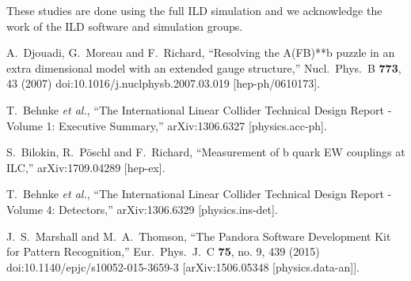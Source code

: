 \documentclass{PoS}
\begin{document}
These studies are done using the full ILD simulation and we acknowledge the work of the ILD software and simulation groups.



% 

%

\begin{thebibliography}{99}
	A.~Djouadi, G.~Moreau and F.~Richard,
	``Resolving the A(FB)**b puzzle in an extra dimensional model with an extended gauge structure,''
	Nucl.\ Phys.\ B {\bf 773}, 43 (2007)
	doi:10.1016/j.nuclphysb.2007.03.019
	[hep-ph/0610173].
	
	
	T.~Behnke {\it et al.},
	``The International Linear Collider Technical Design Report - Volume 1: Executive Summary,''
	arXiv:1306.6327 [physics.acc-ph].
	
	
	S.~Bilokin, R.~Pöschl and F.~Richard,
	``Measurement of b quark EW couplings at ILC,''
	arXiv:1709.04289 [hep-ex].
	
	
	T.~Behnke {\it et al.},
	``The International Linear Collider Technical Design Report - Volume 4: Detectors,''
	arXiv:1306.6329 [physics.ins-det].
	
	
	J.~S.~Marshall and M.~A.~Thomson,
	``The Pandora Software Development Kit for Pattern Recognition,''
	Eur.\ Phys.\ J.\ C {\bf 75}, no. 9, 439 (2015)
	doi:10.1140/epjc/s10052-015-3659-3
	[arXiv:1506.05348 [physics.data-an]].
	
	
\end{thebibliography}
\end{document}
